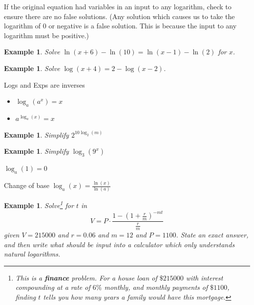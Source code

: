 \documentclass[twoside]{tufte-handout}
\newcounter{ekcounter}%
\theoremstyle{ekimcustom}
\newtheorem{exm}[ekcounter]{Example}
\begin{document}
\begin{bhabit}{}{}
If the original equation had variables in an input to any logarithm, check to ensure there are no false solutions. (Any solution which causes us to take the logarithm of $0$ or negative is a false solution. This is because the input to any logarithm must be positive.)
\end{bhabit}

\begin{exm}{Solve $\ln(x+6)-\ln(10)=\ln(x-1)-\ln(2)$ for $x$.}
\end{exm}\vskip10pt


\begin{exm}{Solve $\log(x+4)=2-\log(x-2)$.}
\end{exm}\vskip10pt



\begin{bformula}{Logs and Exps are inverses}{}
\begin{itemize}
				\item  $\log_a(a^x)=x$ 
	\item   $a^{\log_a(x)}=x$  
\end{itemize}	
\end{bformula}

\begin{exm}
Simplify $2^{10 \log_2(m)}$
\end{exm}
\vskip40pt

\begin{exm}
Simplify $\log_3(9^x)$
\end{exm}
\vskip40pt


\begin{bformula}{}{}
$\log_a(1)=0$ 
\end{bformula}


\begin{bformula}{Change of base}{}
$\log_a(x)=\frac{\ln(x)}{\ln(a)}$ 
\end{bformula}

\begin{exm}
Solve\footnote{This is a {\bf finance} problem. For a house loan of $\$215000$ with interest compounding at a rate of $6\%$ monthly, and monthly payments of $\$1100$, finding $t$ tells you how many years a family would have this mortgage.} for $t$ in
\[ V = P \cdot \frac{1 - (1 + \frac{r}{m})^{-mt}}{\frac{r}{m}} \]
given $V=215000$ and $r=0.06$ and $m=12$ and $P=1100$. State an exact answer, and then write what should be input into a calculator which only understands natural logarithms.
\end{exm}
\end{document}

